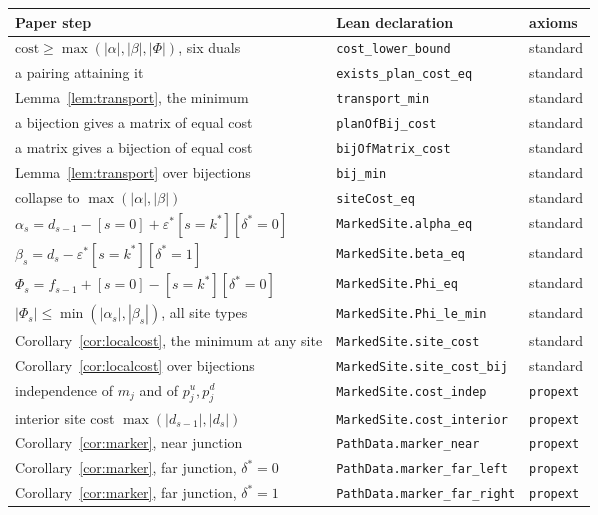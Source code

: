 \documentclass[11pt]{article}
\theoremstyle{plain}
\theoremstyle{definition}
\theoremstyle{remark}
\begin{document}
\begin{center}\small
\begin{tabular}{lll}
\hline
Paper step & Lean declaration & axioms \\
\hline
$\mathrm{cost}\ge\max(|\alpha|,|\beta|,|\Phi|)$, six duals & \texttt{cost\_lower\_bound} & standard\\
a pairing attaining it & \texttt{exists\_plan\_cost\_eq} & standard\\
Lemma~\ref{lem:transport}, the minimum & \texttt{transport\_min} & standard\\
a bijection gives a matrix of equal cost & \texttt{planOfBij\_cost} & standard\\
a matrix gives a bijection of equal cost & \texttt{bijOfMatrix\_cost} & standard\\
Lemma~\ref{lem:transport} over bijections & \texttt{bij\_min} & standard\\
collapse to $\max(|\alpha|,|\beta|)$ & \texttt{siteCost\_eq} & standard\\
$\alpha_s=d_{s-1}-[s{=}0]+\varepsilon^\ast[s{=}k^\ast][\delta^\ast{=}0]$ & \texttt{MarkedSite.alpha\_eq} & standard\\
$\beta_s=d_s-\varepsilon^\ast[s{=}k^\ast][\delta^\ast{=}1]$ & \texttt{MarkedSite.beta\_eq} & standard\\
$\Phi_s=f_{s-1}+[s{=}0]-[s{=}k^\ast][\delta^\ast{=}0]$ & \texttt{MarkedSite.Phi\_eq} & standard\\
$|\Phi_s|\le\min(|\alpha_s|,|\beta_s|)$, all site types & \texttt{MarkedSite.Phi\_le\_min} & standard\\
Corollary~\ref{cor:localcost}, the minimum at any site & \texttt{MarkedSite.site\_cost} & standard\\
Corollary~\ref{cor:localcost} over bijections & \texttt{MarkedSite.site\_cost\_bij} & standard\\
independence of $m_j$ and of $p^u_j,p^d_j$ & \texttt{MarkedSite.cost\_indep} & \texttt{propext}\\
interior site cost $\max(|d_{s-1}|,|d_s|)$ & \texttt{MarkedSite.cost\_interior} & \texttt{propext}\\
Corollary~\ref{cor:marker}, near junction & \texttt{PathData.marker\_near} & \texttt{propext}\\
Corollary~\ref{cor:marker}, far junction, $\delta^\ast{=}0$ & \texttt{PathData.marker\_far\_left} & \texttt{propext}\\
Corollary~\ref{cor:marker}, far junction, $\delta^\ast{=}1$ & \texttt{PathData.marker\_far\_right} & \texttt{propext}\\

\end{tabular}
\end{center}
\end{document}
